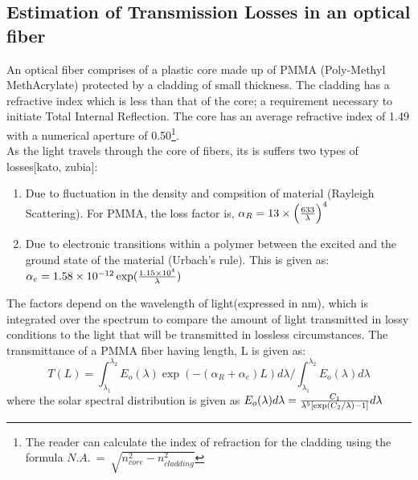\documentclass[times, 10pt,a4paper]{article}
\begin{document}
\subsection{Estimation of Transmission Losses in an optical fiber}
An optical fiber comprises of a plastic core made up of PMMA (Poly-Methyl MethAcrylate) protected by a cladding of small thickness. The cladding has a
refractive index which is less than that of the core; a requirement necessary to initiate Total Internal Reflection. The core has an average refractive index
of 1.49 with a numerical aperture of 0.50\footnote[2]{The reader can calculate the index of refraction for the cladding using the formula $ N.A. \ = \ \sqrt{n_{core}^2 - n_{cladding}^2}$}.  \\
As the light travels through the core of fibers, its is suffers two types of losses[kato, zubia]: 
\begin{enumerate}
\item{Due to fluctuation in the density and compsition of material (Rayleigh Scattering). 
For PMMA, the loss factor is, $\alpha_R = 13 \times \Big({633 \over \lambda}\Big)^4$}
\item{ Due to electronic transitions within a polymer between the excited and the ground state of the material (Urbach's rule). This is given as:
$\alpha_e = 1.58 \times 10^{-12}\exp({{1.15 \times 10^4} \over \lambda})$} 
\end{enumerate}
The factors depend on the wavelength of light(expressed in nm), which is integrated over the spectrum to compare the
amount of light transmitted in lossy conditions to the light that will be transmitted in lossless circumstances.
The transmittance of a PMMA fiber having length, L is given as:
\begin{equation}
T(L) = \int_{\lambda_1}^{\lambda_2} E_o(\lambda)\exp(-(\alpha_R  + \alpha_e)L)d\lambda/
\int_{\lambda_1}^{\lambda_2} E_o(\lambda)d\lambda
\end{equation}
where the solar spectral distribution is given as $E_o(\lambda)d\lambda = {C_1 \over {\lambda^5 [\exp(C_2/\lambda) - 1]}} d\lambda$ 
\end{document}
